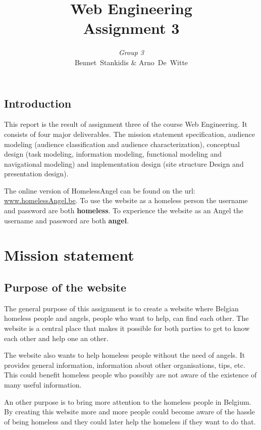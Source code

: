 \documentclass[a4paper]{report}
\author{\textit{Group 3}\\ Bennet~Stankidis \& Arno~De~Witte}
\title{{\Huge Web Engineering}\\Assignment 3}
\begin{document}
\maketitlepage
\tableofcontents
\clearpage










\section{Introduction}
This report is the result of assignment three of the course Web Engineering. It consists of four major deliverables. The mission statement specification, audience modeling (audience classification and audience characterization), conceptual design (task modeling, information modeling, functional modeling and navigational modeling) and implementation design (site structure Design and presentation design).

The online version of HomelessAngel can be found on the url: \url{www.homelessAngel.be}. To use the website as a homeless person the username and password are both \textbf{homeless}. To experience the website as an Angel the username and password are both \textbf{angel}.













\chapter{Mission statement}
\section{Purpose of the website}
The general purpose of this assignment is to create a website where Belgian homeless people and angels, people who want to help, can find each other. The website is a central place that makes it possible for both parties to get to know each other and help one an other. 

The website also wants to help homeless people without the need of angels. It provides general information, information about other organisations, tips, etc. This could benefit homeless people who possibly are not aware of the existence of many useful information.

An other purpose is to bring more attention to the homeless people in Belgium. By creating this website more and more people could become aware of the hassle of being homeless and they could later help the homeless if they want to do that.
\end{document}
